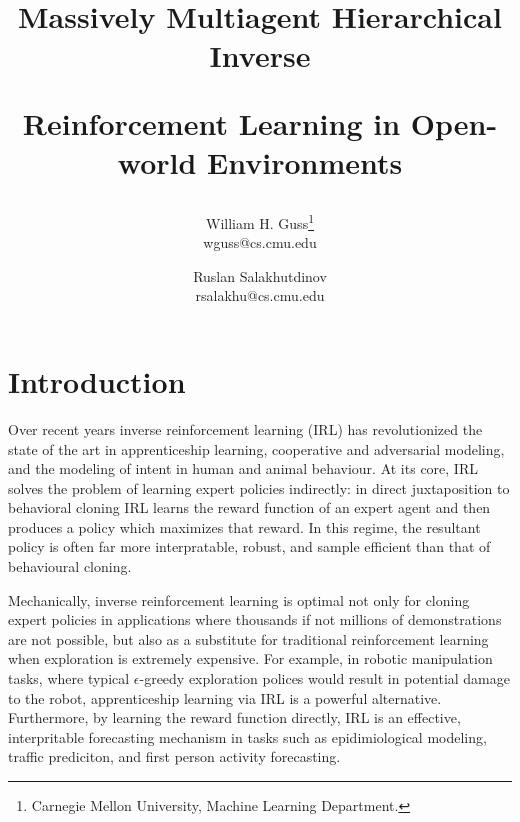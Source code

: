 \documentclass[11pt]{article}
\title{
 \begin{minipage}[c]{1.05\textwidth}
 	\centerline{Massively Multiagent Hierarchical Inverse}
 	\centerline{Reinforcement Learning in Open-world Environments}
 \end{minipage}
}
\author{
	\vspace{1cm}
	William H. Guss\thanks{Carnegie Mellon University, Machine Learning Department.}\\[-1cm]
	wguss@cs.cmu.edu \and
	Ruslan Salakhutdinov\footnotemark[1] \\
	rsalakhu@cs.cmu.edu
}
\begin{document}
\maketitle
\thispagestyle{empty}

\begin{abstract}
\end{abstract}

\setcounter{page}{1}


\section{Introduction}


Over recent years inverse reinforcement learning (IRL) has revolutionized the state of the art in apprenticeship learning, cooperative and adversarial modeling, and the modeling of intent in human and animal behaviour. At its core, IRL solves the problem of learning expert policies indirectly: in direct juxtaposition to behavioral cloning IRL learns the reward function of an expert agent and then produces a policy which maximizes that reward. In this regime, the resultant policy is often far more interpratable, robust, and sample efficient than that of behavioural cloning. 

Mechanically, inverse reinforcement learning is optimal not only for cloning expert policies in applications where thousands if not millions of demonstrations are not possible, but also as a substitute for traditional reinforcement learning when exploration is extremely expensive. For example, in robotic manipulation tasks, where typical $\epsilon$-greedy exploration polices would result in potential damage to the robot, apprenticeship learning via IRL is a powerful alternative. Furthermore, by learning the reward function directly, IRL is an effective, interpritable forecasting mechanism in tasks such as epidimiological modeling, traffic prediciton, and first person activity forecasting.
\end{document}
